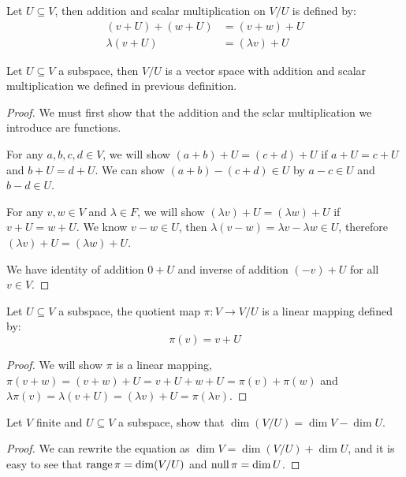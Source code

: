 \documentclass[../main.tex]{subfiles}
\begin{document}
\setcounter{definition}{101}
\begin{definition}
  Let $U \subseteq V$, then addition and scalar multiplication on $V/U$ is defined by:
  \begin{align*}
    (v + U) + (w + U) & = (v + w) + U \\
    \lambda (v + U) & = (\lambda v) + U
  \end{align*}
\end{definition}

\setcounter{theorem}{102}
\begin{theorem}
  Let $U \subseteq V$ a subspace, then $V/U$ is a vector space with addition and scalar
  multiplication we defined in previous definition.
\end{theorem}
\begin{proof}
  We must first show that the addition and the sclar multiplication we introduce
  are functions.

  For any $a, b, c, d \in V$, we will show $(a + b) + U = (c + d) + U$ if
  $a + U = c + U$ and $b + U = d + U$.
  We can show $(a + b) - (c + d) \in U$ by $a - c \in U$ and $b - d \in U$.

  For any $v, w \in V$ and $\lambda \in F$, we will show $(\lambda v) + U = (\lambda w) + U$
  if $v + U = w + U$.
  We know $v - w \in U$, then $\lambda (v - w) = \lambda v - \lambda w \in U$,
  therefore $(\lambda v) + U = (\lambda w) + U$.

  We have identity of addition $0 + U$ and inverse of addition $(- v) + U$ for all $v \in V$.
\end{proof}

\setcounter{definition}{103}
\begin{definition}
  Let $U \subseteq V$ a subspace, the quotient map $\pi : V \rightarrow V/U$
  is a linear mapping defined by:
  \[
  \pi(v) = v + U
  \]
\end{definition}
\begin{proof}
  We will show $\pi$ is a linear mapping, $\pi(v + w) = (v + w) + U = v + U + w + U = \pi(v) + \pi(w)$
  and $\lambda \pi(v) = \lambda (v + U) = (\lambda v) + U = \pi(\lambda v)$.
\end{proof}

\setcounter{theorem}{\value{definition}}
\begin{theorem}
  Let $V$ finite and $U \subseteq V$ a subspace, show that $\dim (V / U) = \dim V - \dim U$.
\end{theorem}
\begin{proof}
  We can rewrite the equation as $\dim V = \dim (V / U) + \dim U$,
  and it is easy to see that $\operatorname{range} \pi = \dim (V / U)$ and $\operatorname{null} \pi = \dim U$.
\end{proof}
\end{document}
